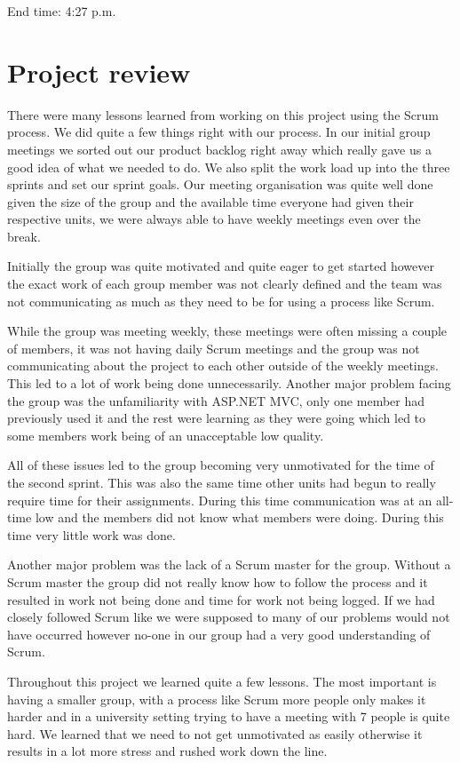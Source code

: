 \documentclass[a4paper,titlepage,12pt]{article}
\let\stdsection\section
\renewcommand\section{\newpage\stdsection}
\begin{document}
End time: 4:27 p.m.

\section{Project review}

There were many lessons learned from working on this project using the Scrum
process. We did quite a few things right with our process. In our initial group
meetings we sorted out our product backlog right away which really gave us a
good idea of what we needed to do. We also split the work load up into the
three sprints and set our sprint goals. Our meeting organisation was quite well
done given the size of the group and the available time everyone had given
their respective units, we were always able to have weekly meetings even over
the break.

Initially the group was quite motivated and quite eager to get started however
the exact work of each group member was not clearly defined and the team was
not communicating as much as they need to be for using a process like Scrum.

While the group was meeting weekly, these meetings were often missing a couple
of members, it was not having daily Scrum meetings and the group was not
communicating about the project to each other outside of the weekly meetings.
This led to a lot of work being done unnecessarily. Another major problem
facing the group was the unfamiliarity with ASP.NET MVC, only one member had
previously used it and the rest were learning as they were going which led to
some members work being of an unacceptable low quality.

All of these issues led to the group becoming very unmotivated for the time of
the second sprint. This was also the same time other units had begun to really
require time for their assignments. During this time communication was at an
all-time low and the members did not know what members were doing. During this
time very little work was done.

Another major problem was the lack of a Scrum master for the group. Without a
Scrum master the group did not really know how to follow the process and it
resulted in work not being done and time for work not being logged. If we had
closely followed Scrum like we were supposed to many of our problems would not
have occurred however no-one in our group had a very good understanding of
Scrum.

Throughout this project we learned quite a few lessons. The most important is
having a smaller group, with a process like Scrum more people only makes it
harder and in a university setting trying to have a meeting with 7 people is
quite hard. We learned that we need to not get unmotivated as easily otherwise
it results in a lot more stress and rushed work down the line.
\end{document}
